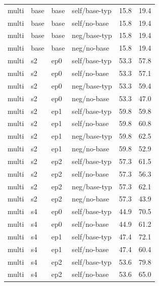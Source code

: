 {\begin{longtable}{llll rr}
\midrule
multi & base & base & self/base-typ & 15.8 & 19.4 \\
multi & base & base & self/no-base & 15.8 & 19.4 \\
multi & base & base & neg/base-typ & 15.8 & 19.4 \\
multi & base & base & neg/no-base & 15.8 & 19.4 \\
multi & s2 & ep0 & self/base-typ & 53.3 & 57.8 \\
multi & s2 & ep0 & self/no-base & 53.3 & 57.1 \\
multi & s2 & ep0 & neg/base-typ & 53.3 & 59.4 \\
multi & s2 & ep0 & neg/no-base & 53.3 & 47.0 \\
multi & s2 & ep1 & self/base-typ & 59.8 & 59.8 \\
multi & s2 & ep1 & self/no-base & 59.8 & 60.8 \\
multi & s2 & ep1 & neg/base-typ & 59.8 & 62.5 \\
multi & s2 & ep1 & neg/no-base & 59.8 & 52.9 \\
multi & s2 & ep2 & self/base-typ & 57.3 & 61.5 \\
multi & s2 & ep2 & self/no-base & 57.3 & 56.3 \\
multi & s2 & ep2 & neg/base-typ & 57.3 & 62.1 \\
multi & s2 & ep2 & neg/no-base & 57.3 & 43.9 \\
multi & s4 & ep0 & self/base-typ & 44.9 & 70.5 \\
multi & s4 & ep0 & self/no-base & 44.9 & 61.2 \\
multi & s4 & ep1 & self/base-typ & 47.4 & 72.1 \\
multi & s4 & ep1 & self/no-base & 47.4 & 60.4 \\
multi & s4 & ep2 & self/base-typ & 53.6 & 79.8 \\
multi & s4 & ep2 & self/no-base & 53.6 & 65.0 \\
\bottomrule
\end{longtable}
}
